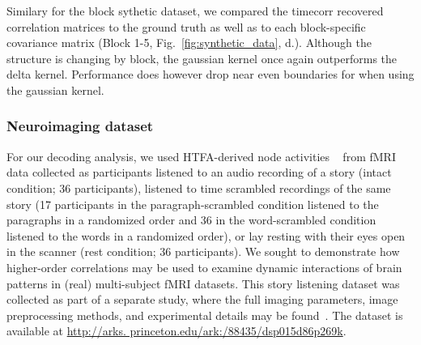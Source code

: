 \documentclass[english]{article}
\begin{document}
Similary for the block sythetic dataset, we compared the timecorr
recovered correlation matrices to the ground truth as well as to each
block-specific covariance matrix (Block 1-5,
Fig.~\ref{fig:synthetic_data},  d.).  Although the structure is
changing by block, the gaussian kernel once again outperforms the
delta kernel.  Performance does however drop near even boundaries for
when using the gaussian kernel. 


\subsubsection*{Neuroimaging dataset~\citep{SimoEtal16}}
For our decoding analysis, we used HTFA-derived node activities
~\cite{MannEtal18} from fMRI data collected as participants listened
to an audio recording of a story (intact condition; 36 participants),
listened to time scrambled recordings of the same story (17
participants in the paragraph-scrambled condition listened to the
paragraphs in a randomized order and 36 in the word-scrambled
condition listened to the words in a randomized order), or lay resting
with their eyes open in the scanner (rest condition; 36
participants). We sought to demonstrate how higher-order correlations
may be used to examine dynamic interactions of brain patterns in
(real) multi-subject fMRI datasets. This story listening dataset was
collected as part of a separate study, where the full imaging
parameters, image preprocessing methods, and experimental details may
be found~\citep{SimoEtal16}. The dataset is available at
\href{url}{http://arks. princeton.edu/ark:/88435/dsp015d86p269k}.
\end{document}
